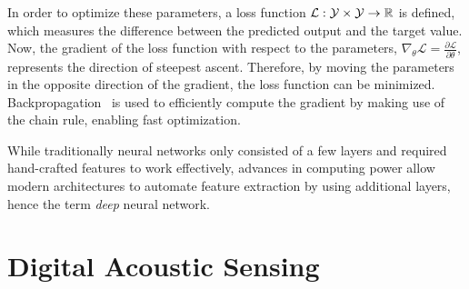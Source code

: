 In order to optimize these parameters, a loss function $\mathcal{L}: \mathcal{Y} \times \mathcal{Y} \rightarrow \mathbb{R}$ is 
defined, which measures the difference between the predicted output and the target value. 
Now, the gradient of the loss function with respect to the parameters, 
$\nabla_\theta \mathcal{L} = \frac{\partial \mathcal{L}}{\partial \theta}$, represents the direction of steepest ascent.
Therefore, by moving the parameters in the opposite direction of the gradient, the loss function can be minimized.
Backpropagation~\cite{Backpropagation} is used to efficiently compute the gradient by making use of the
chain rule, enabling fast optimization.

While traditionally neural networks only consisted of a few layers and required hand-crafted features to work 
effectively, advances in computing power allow modern architectures to automate feature extraction by using additional 
layers, hence the term \textit{deep} neural network.

\section{Digital Acoustic Sensing}
